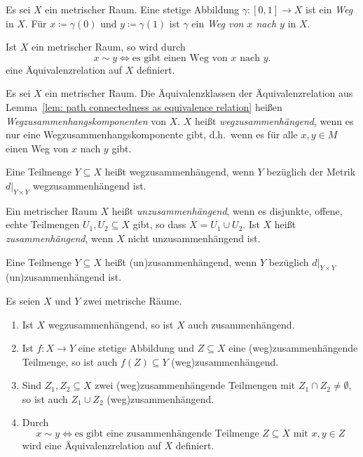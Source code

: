 \begin{definition}
  Es sei $X$ ein metrischer Raum.
  Eine stetige Abbildung $\gamma \colon [0,1] \to X$ ist ein \emph{Weg} in $X$.
  Für $x \coloneqq \gamma(0)$ und $y \coloneqq \gamma(1)$ ist $\gamma$ ein \emph{Weg von $x$ nach $y$} in $X$.
\end{definition}


\begin{lemma}\label{lem: path connectedness as equivalence relation}
  Ist $X$ ein metrischer Raum, so wird durch
  \[
    x \sim y
    \iff
    \text{es gibt einen Weg von $x$ nach $y$}.
  \]
  eine Äquivalenzrelation auf $X$ definiert.
\end{lemma}


\begin{definition}
  Es sei $X$ ein metrischer Raum.
  Die Äquivalenzklassen der Äquivalenzrelation aus Lemma~\ref{lem: path connectedness as equivalence relation} heißen \emph{Wegzusammenhangskomponenten} von $X$.
  $X$ heißt \emph{wegzusammenhängend}, wenn es nur eine Wegzusammenhangskomponente gibt, d.h.\ wenn es für alle $x, y \in M$ einen Weg von $x$ nach $y$ gibt.
  
  Eine Teilmenge $Y \subseteq X$ heißt wegzusammenhängend, wenn $Y$ bezüglich der Metrik $d|_{Y \times Y}$ wegzusammenhängend ist.
\end{definition}


\begin{definition}
  Ein metrischer Raum $X$ heißt \emph{unzusammenhängend}, wenn es disjunkte, offene, echte Teilmengen $U_1, U_2 \subseteq X$ gibt, so dass $X = U_1 \cup U_2$.
  Ist $X$ heißt \emph{zusammenhängend}, wenn $X$ nicht unzusammenhängend ist.
  
  Eine Teilmenge $Y \subseteq X$ heißt (un)zusammenhängend, wenn $Y$ bezüglich $d|_{Y \times Y}$ (un)zu\-sammenhängend ist.
\end{definition}


\begin{proposition}\label{prop: equivalence relation for connectedness}
  Es seien $X$ und $Y$ zwei metrische Räume.
  \begin{enumerate}[leftmargin=*, label=\roman*)]
    \item
      Ist $X$ wegzusammenhängend, so ist $X$ auch zusammenhängend.
    \item
      Ist $f \colon X \to Y$ eine stetige Abbildung und $Z \subseteq X$ eine (weg)zusammenhängende Teilmenge, so ist auch $f(Z) \subseteq Y$ (weg)zusammenhängend.
    \item
      Sind $Z_1, Z_2 \subseteq X$ zwei (weg)zusammenhängende Teilmengen mit $Z_1 \cap Z_2 \neq \emptyset$, so ist auch $Z_1 \cup Z_2$ (weg)zusammenhängend.
    \item
      Durch
      \[
        x \sim y
        \iff
        \text{es gibt eine zusammenhängende Teilmenge $Z \subseteq X$ mit $x, y \in Z$}
      \]
      wird eine Äquivalenzrelation auf $X$ definiert.
  \end{enumerate}
\end{proposition}


